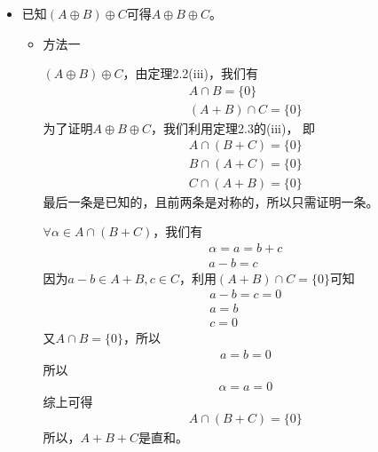 \documentclass{article}
\begin{document}
\begin{itemize}
  \item 已知$(A \oplus B) \oplus C$可得$A \oplus B \oplus C$。

        \begin{itemize}
          \item 方法一

                $(A \oplus B) \oplus C$，由定理2.2(iii)，我们有
                \begin{align*}
                  A \cap B = \{0\} \\
                  (A + B) \cap C = \{0\}
                \end{align*}
                为了证明$A \oplus B \oplus C$，我们利用定理2.3的(iii)，
                即
                \begin{align*}
                  A \cap (B + C) = \{0\} \\
                  B \cap (A + C) = \{0\} \\
                  C \cap (A + B) = \{0\}
                \end{align*}
                最后一条是已知的，且前两条是对称的，所以只需证明一条。

                $\forall \alpha \in A \cap (B + C)$，我们有
                \begin{align*}
                  \alpha = a = b + c \\
                  a - b = c
                \end{align*}
                因为$a - b \in A + B, c \in C$，利用$(A + B) \cap C = \{0\} $可知
                \begin{align*}
                  a - b = c = 0 \\
                  a = b         \\
                  c = 0
                \end{align*}
                又$A \cap B = \{0\}$，所以
                \begin{align*}
                  a = b = 0
                \end{align*}
                所以
                \begin{align*}
                  \alpha = a = 0
                \end{align*}
                综上可得
                \begin{align*}
                  A \cap (B + C) = \{0\}
                \end{align*}
                所以，$A + B + C$是直和。


\end{itemize}
\end{itemize}
\end{document}
